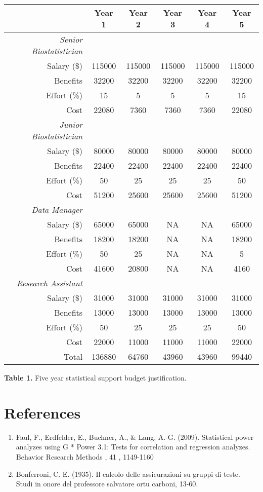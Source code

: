 \documentclass[
]{article}
\begin{document}
\newpage
\begin{center}
\begin{tabular}{rccccc}
\toprule
 & Year 1 & Year 2 & Year 3 & Year 4 & Year 5\\
\midrule
\textit{Senior Biostatistician} &  &  &  &  & \\
Salary (\$) & 115000 & 115000 & 115000 & 115000 & 115000\\
Benefits & 32200 & 32200 & 32200 & 32200 & 32200\\
Effort (\%) & 15 & 5 & 5 & 5 & 15\\
Cost & 22080 & 7360 & 7360 & 7360 & 22080\\
\addlinespace
\textit{Junior Biostatistician} &  &  &  &  & \\
Salary (\$) & 80000 & 80000 & 80000 & 80000 & 80000\\
Benefits & 22400 & 22400 & 22400 & 22400 & 22400\\
Effort (\%) & 50 & 25 & 25 & 25 & 50\\
Cost & 51200 & 25600 & 25600 & 25600 & 51200\\
\addlinespace
\textit{Data Manager} &  &  &  &  & \\
Salary (\$) & 65000 & 65000 & NA & NA & 65000\\
Benefits & 18200 & 18200 & NA & NA & 18200\\
Effort (\%) & 50 & 25 & NA & NA & 5\\
Cost & 41600 & 20800 & NA & NA & 4160\\
\addlinespace
\textit{Research Assistant} &  &  &  &  & \\
Salary (\$) & 31000 & 31000 & 31000 & 31000 & 31000\\
Benefits & 13000 & 13000 & 13000 & 13000 & 13000\\
Effort (\%) & 50 & 25 & 25 & 25 & 50\\
Cost & 22000 & 11000 & 11000 & 11000 & 22000\\
\addlinespace
Total & 136880 & 64760 & 43960 & 43960 & 99440\\
\bottomrule
\end{tabular}

\textbf{Table 1.} Five year statistical support budget justification.
\end{center}

\newpage
\section{References}

\begin{enumerate}
\def\labelenumi{\arabic{enumi}.}
\item
  Faul, F., Erdfelder, E., Buchner, A., \& Lang, A.-G. (2009).
  Statistical power analyzes using G * Power 3.1: Tests for correlation
  and regression analyzes. Behavior Research Methods , 41 , 1149-1160
\item
  Bonferroni, C. E. (1935). Il calcolo delle assicurazioni su gruppi di
  teste. Studi in onore del professore salvatore ortu carboni, 13-60.
\end{enumerate}
\end{document}
